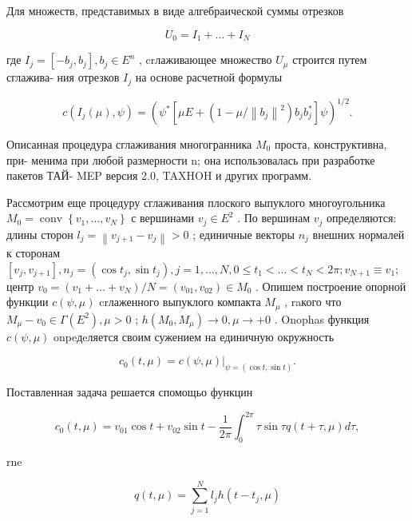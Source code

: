 \documentclass[10pt]{article}
\begin{document}
Для множеств, представимых в виде алгебраической суммы отрезков

\[
{U}_{0} = {I}_{1} + \ldots  + {I}_{N}
\]

где \({I}_{j} = \left[  {-{b}_{j},{b}_{j}}\right]  ,{b}_{j} \in  {E}^{n}\) , crлаживающее множество \({U}_{\mu }\) строится путем сглажива- ния отрезков \({I}_{j}\) на основе расчетной формулы

\[
c\left( {{I}_{j}\left( \mu \right) ,\psi }\right)  = {\left( {\psi }^{ * }\left[  \mu E + \left( 1 - \mu /{\left\lVert {b}_{j} \right\rVert}^{2}\right) {b}_{j}{b}_{j}^{ * }\right]  \psi \right) }^{1/2}.
\]

Описанная процедура сглаживания многогранника \({M}_{0}\) проста, конструктивна, при- менима при любой размерности n; она использовалась при разработке пакетов ТАЙ- MEP версия 2.0, TAXHOH и других программ.

Рассмотрим еще процедуру сглаживания плоского выпуклого многоугольника \({M}_{0} = \operatorname{conv}\left\{  {{v}_{1},\ldots ,{v}_{N}}\right\}\) с вершинами \({v}_{j} \in  {E}^{2}\) . По вершинам \({v}_{j}\) определяются: длины сторон \({l}_{j} = \left\lVert {{v}_{j + 1} - {v}_{j}} \right\rVert > 0\) ; единичные векторы \({n}_{j}\) внешних нормалей к сторонам \(\left[  {{v}_{j},{v}_{j + 1}}\right]  ,{n}_{j} = \left( {\cos {t}_{j},\sin {t}_{j}}\right) ,j = 1,\ldots ,N,0 \leq  {t}_{1} < \ldots  < {t}_{N} < {2\pi };{v}_{N + 1} \equiv  {v}_{1};\) центр \({v}_{0} = \left( {{v}_{1} + \ldots  + {v}_{N}}\right) /N = \left( {{v}_{01},{v}_{02}}\right)  \in  {M}_{0}\) . Опишем построение опорной функции \(c\left( {\psi ,\mu }\right)\) crлаженного выпуклого компакта \({M}_{\mu }\) , raкого что \({M}_{\mu } - {v}_{0} \in  \Gamma \left( {E}^{2}\right) ,\mu  > 0\) ; \(h\left( {{M}_{0},{M}_{\mu }}\right)  \rightarrow  0,\mu  \rightarrow   + 0\) . Onophas функция \(c\left( {\psi ,\mu }\right)\) onpeдeляется своим сужением на единичную окружность

\[
{c}_{0}\left( {t,\mu }\right)  = {\left. c\left( \psi ,\mu \right) \right| }_{\psi  = \left( {\cos t,\sin t}\right) }.
\]

Поставленная задача решается спомощьо функцин

\[
{c}_{0}\left( {t,\mu }\right)  = {v}_{01}\cos t + {v}_{02}\sin t - \frac{1}{2\pi }{\int }_{0}^{2\pi }\tau \sin {\tau q}\left( {t + \tau ,\mu }\right) {d\tau },
\]

rne

\[
q\left( {t,\mu }\right)  = \mathop{\sum }\limits_{{j = 1}}^{N}{l}_{j}h\left( {t - {t}_{j},\mu }\right)
\]
\end{document}
